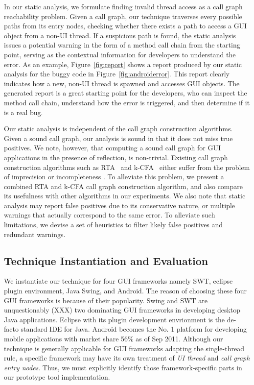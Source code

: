 In our static analysis, we formulate finding invalid thread access as a call graph reachability
problem. Given a call graph, our technique traverses
every possible paths from its entry nodes, checking whether
there exists a path to access a GUI object from a non-UI thread. If 
a suspicious path is found,
the static analysis issues a potential warning in the form of a method
call chain from the starting point, serving as the contextual information
for developers to understand the error.
As an example, Figure~\ref{fig:report} shows a report produced
by our static analysis for the buggy code in Figure~\ref{fig:androiderror}.
This report clearly indicates how a new, non-UI thread is spawned and
accesses GUI objects. 
The generated report is a great starting point for the developers, who can
inspect the method call chain, understand how the error
is triggered, and then determine if it is a real bug.

Our static analysis is independent of the call graph construction algorithms.
Given a sound call graph, our analysis is sound in that it does
not miss true positives. We note, however, that computing a sound
call graph for GUI applications in the presence of reflection,
is non-trivial.
Existing call graph construction algorithms such as RTA~\cite{} and k-CFA~\cite{}
either suffer from the problem of imprecision or incompleteness .
To alleviate this problem,
we present a combined RTA and k-CFA call graph construction algorithm, and
also compare its usefulness with other algorithms in  our experiments. We
also note that static analysis may report false positives due to its
conservative nature, or multiple warnings that actually correspond
to the same error. To alleviate such limitations, we devise a set
 of heuristics to filter likely false positives and redundant warnings.

\subsection{Technique Instantiation and Evaluation}


We instantiate our technique for four GUI frameworks namely SWT,
eclipse plugin environment, Java Swing, and Android. 
The reason of choosing these four GUI frameworks is because of
their popularity. Swing and SWT are unquestionably (XXX)
two dominating GUI frameworks in developing desktop Java applications.
Eclipse with its plugin development envrionment is the de-facto standard
IDE for Java. Android becomes the No. 1 platform for
developing mobile applications with market share 56\% as of Sep 2011.
Although our technique is generally applicable for GUI
frameworks adapting the single-thread rule, a specific framework
may have its own treatment of \textit{UI thread} and \textit{call graph
entry nodes}. Thus, we must explicitly identify those framework-specific
parts in our prototype tool implementation.

